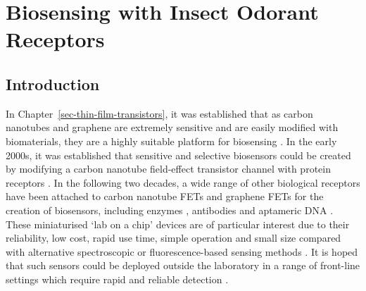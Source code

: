 \documentclass[
  a4paper,
]{scrbook}
\begin{document}
\hypertarget{sec-iOR-sensors}{%
\chapter{Biosensing with Insect Odorant
Receptors}\label{sec-iOR-sensors}}

\hypertarget{sec-biosensing-transducers}{%
\section{Introduction}\label{sec-biosensing-transducers}}

In Chapter~\ref{sec-thin-film-transistors}, it was established that as
carbon nanotubes and graphene are extremely sensitive and are easily
modified with biomaterials, they are a highly suitable platform for
biosensing \autocite{Kauffman2008,Ohno2010}. In the early 2000s, it was
established that sensitive and selective biosensors could be created by
modifying a carbon nanotube field-effect transistor channel with protein
receptors \autocite{Chen2003,Kauffman2008}. In the following two
decades, a wide range of other biological receptors have been attached
to carbon nanotube FETs and graphene FETs for the creation of
biosensors, including enzymes \autocite{Lee2009,Zhang2015a,Dudina2019},
antibodies \autocite{Kim2008,Jin2015,Tsang2019} and aptameric DNA
\autocite{Maehashi2007,Gao2016,Nguyen2021}. These miniaturised `lab on a
chip' devices are of particular interest due to their reliability, low
cost, rapid use time, simple operation and small size compared with
alternative spectroscopic or fluorescence-based sensing methods
\autocite{Khan2020}. It is hoped that such sensors could be deployed
outside the laboratory in a range of front-line settings which require
rapid and reliable detection \autocite{Dung2018,Yang2018,Kim2022a}.
\end{document}
